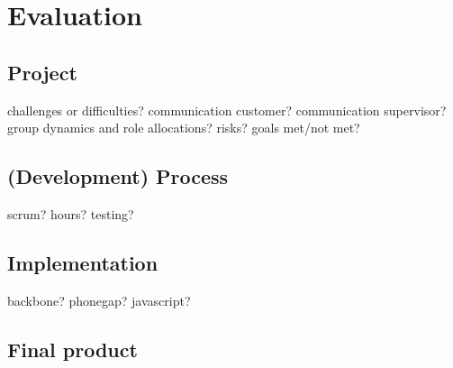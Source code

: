 \section{Evaluation}

\subsection{Project}

challenges or difficulties?
communication customer?
communication supervisor?
group dynamics and role allocations?
risks?
goals met/not met?

\subsection{(Development) Process}

scrum?
hours?
testing?


\subsection{Implementation}

backbone?
phonegap?
javascript?

\subsection{Final product}